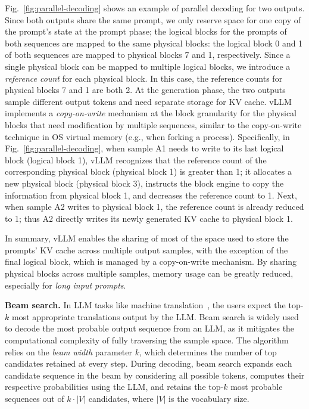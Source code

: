 Fig.~\ref{fig:parallel-decoding} shows an example of parallel decoding for two outputs. Since both outputs share the same prompt, we only reserve space for one copy of the prompt's state at the prompt phase; the logical blocks for the prompts of both sequences are mapped to the same physical blocks: the logical block 0 and 1 of both sequences are mapped to physical blocks 7 and 1, respectively. Since a single physical block can be mapped to multiple logical blocks, we introduce a \emph{reference count} for each physical block. In this case, the reference counts for physical blocks 7 and 1 are both 2. At the generation phase, the two outputs sample different output tokens and need separate storage for KV cache. vLLM implements a \emph{copy-on-write} mechanism at the block granularity for the physical blocks that need modification by multiple sequences, similar to the copy-on-write technique in OS virtual memory (e.g., when forking a process). Specifically, in Fig.~\ref{fig:parallel-decoding}, when sample A1 needs to write to its last logical block (logical block 1), vLLM recognizes that the reference count of the corresponding physical block (physical block 1) is greater than 1; it allocates a new physical block (physical block 3), instructs the block engine to copy the information from physical block 1, and decreases the reference count to 1. Next, when sample A2 writes to physical block 1, the reference count is already reduced to 1; thus A2 directly writes its newly generated KV cache to physical block 1. 

In summary, vLLM enables the sharing of most of the space used to store the prompts' KV cache across multiple output samples, with the exception of the final logical block, which is managed by a copy-on-write mechanism. By sharing physical blocks across multiple samples, memory usage can be greatly reduced, especially for \emph{long input prompts}. 

\textbf{Beam search.} In LLM tasks like machine translation~\cite{wu2016google}, the users expect the top-$k$ most appropriate translations output by the LLM. Beam search \cite{sutskever2014sequence} is widely used to decode the most probable output sequence from an LLM, as it mitigates the computational complexity of fully traversing the sample space. The algorithm relies on the \emph{beam width} parameter $k$, which determines the number of top candidates retained at every step. During decoding, beam search expands each candidate sequence in the beam by considering all possible tokens, computes their respective probabilities using the LLM, and retains the top-$k$ most probable sequences out of $k \cdot |V|$ candidates, where $|V|$ is the vocabulary size.

